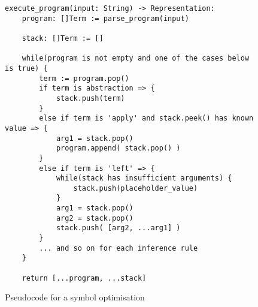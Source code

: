 \begin{figure}[htb]
    \centering
    \begin{lstlisting}
execute_program(input: String) -> Representation:
    program: []Term := parse_program(input)
    
    stack: []Term := []
    
    while(program is not empty and one of the cases below is true) {
        term := program.pop()
        if term is abstraction => {
            stack.push(term)
        }
        else if term is 'apply' and stack.peek() has known value => {
            arg1 = stack.pop()
            program.append( stack.pop() )
        }
        else if term is 'left' => {
            while(stack has insufficient arguments) {
                stack.push(placeholder_value)
            }
            arg1 = stack.pop()
            arg2 = stack.pop()
            stack.push( [arg2, ...arg1] )
        }
        ... and so on for each inference rule
    }

    return [...program, ...stack]
    \end{lstlisting}
    \caption{Pseudocode for a symbol optimisation}
    \label{fig:symbol_optimisation_pseudocode}
\end{figure}